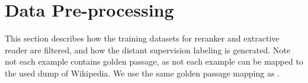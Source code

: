 \documentclass[11pt]{article}
\begin{document}
\begin{table}[H]
    \centering
    \caption{Binary decision on NQ-Open, TQ-Open and EfficientQA.}
    \label{tab:binary-decision_appendix}
\end{table}


\section{Data Pre-processing}
\label{app:data_preprocessing}
This section describes how the training datasets for reranker and extractive reader are filtered, and how the distant supervision labeling is generated. Note not each example contains golden passage, as not each example can be mapped to the used dump of Wikipedia. We use the same golden passage mapping as \citet{karpukhin2020dense}.
\end{document}
